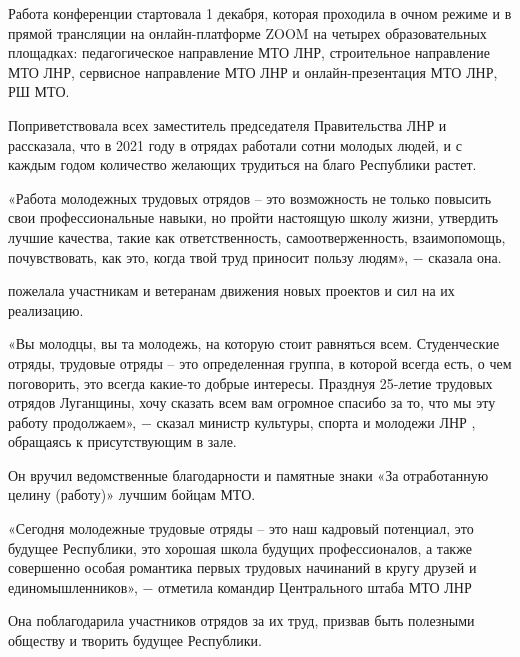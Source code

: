 Работа конференции стартовала 1 декабря, которая проходила в очном режиме и в
прямой трансляции на онлайн-платформе ZOOM на четырех образовательных
площадках: педагогическое направление МТО ЛНР, строительное направление МТО
ЛНР, сервисное направление МТО ЛНР и онлайн-презентация МТО ЛНР, РШ МТО.


Поприветствовала всех заместитель председателя Правительства ЛНР 
и рассказала, что в 2021 году в отрядах работали сотни молодых людей, и с
каждым годом количество желающих трудиться на благо Республики растет.

\begin{zzquote}
«Работа молодежных трудовых отрядов – это возможность не только повысить свои
профессиональные навыки, но пройти настоящую школу жизни, утвердить лучшие
качества, такие как ответственность, самоотверженность, взаимопомощь,
почувствовать, как это, когда твой труд приносит пользу людям», − сказала она.	
\end{zzquote}

 пожелала участникам и ветеранам движения новых
проектов и сил на их реализацию.

\begin{zzquote}
«Вы молодцы, вы та молодежь, на которую стоит равняться всем. Студенческие
отряды, трудовые отряды – это определенная группа, в которой всегда есть, о чем
поговорить, это всегда какие-то добрые интересы. Празднуя 25-летие трудовых
отрядов Луганщины, хочу сказать всем вам огромное спасибо за то, что мы эту
работу продолжаем», −  сказал министр культуры, спорта и молодежи ЛНР , обращаясь к присутствующим в зале.	
\end{zzquote}

Он вручил ведомственные благодарности и памятные знаки «За отработанную целину
(работу)» лучшим бойцам МТО.

\begin{zzquote}
«Сегодня молодежные трудовые отряды – это наш кадровый потенциал, это
будущее Республики, это хорошая школа будущих профессионалов, а также
совершенно особая романтика первых трудовых начинаний в кругу друзей и
единомышленников», −  отметила командир Центрального штаба МТО ЛНР 
\end{zzquote}

Она поблагодарила участников отрядов за их труд, призвав быть полезными
обществу и творить будущее Республики.

